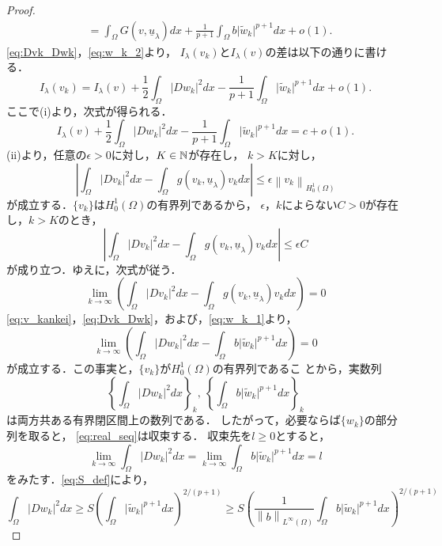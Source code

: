 \begin{proof}
\begin{align}
  &= \int_\Omega G(v, \underline{u}_\lambda) dx + \frac{1}{p+1}
  \int_\Omega b \lvert \tilde{w}_k \rvert^{p+1} dx + o(1). \label{eq:w_k_2}
 \end{align}
 \eqref{eq:Dvk_Dwk}，\eqref{eq:w_k_2}より，
 $I_\lambda(v_k)$と$I_\lambda(v)$の差は以下の通りに書ける．
 \[
  I_\lambda(v_k) = I_\lambda(v) + \frac{1}{2} \int_\Omega \lvert Dw_k
 \rvert^2 dx - \frac{1}{p+1} \int_\Omega \lvert \tilde{w}_k
 \rvert^{p+1} dx + o(1).
 \]
 ここで(i)より，次式が得られる．
 \begin{equation}
  I_\lambda(v) + \frac{1}{2} \int_\Omega \lvert Dw_k
   \rvert^2 dx - \frac{1}{p+1} \int_\Omega \lvert \tilde{w}_k
   \rvert^{p+1} dx = c + o(1). \label{eq:w_k_c}
 \end{equation}
 (ii)より，任意の$\epsilon > 0$に対し，$K \in \mathbb{N}$が存在し，
 $k > K$に対し，
 \[
 \left\lvert \int_\Omega \lvert Dv_k \rvert^2 dx - \int_\Omega g(v_k,
 \underline{u}_\lambda) v_k dx \right\rvert \leq \epsilon \left\| v_k
 \right\|_{H_0^1(\Omega)} 
 \]
 が成立する．$\{ v_k \}$は$H_0^1(\Omega)$の有界列であるから，
 $\epsilon$，$k$によらない$C > 0$が存在し，$k > K$のとき，
 \[
 \left\lvert \int_\Omega \lvert Dv_k \rvert^2 dx - \int_\Omega g(v_k,
 \underline{u}_\lambda) v_k dx \right\rvert \leq \epsilon C
 \]
 が成り立つ．ゆえに，次式が従う．
 \[
 \lim_{k \to \infty} \left( \int_\Omega \lvert Dv_k \rvert^2 dx -
 \int_\Omega g(v_k, \underline{u}_\lambda) v_k dx \right) = 0
 \]
 \eqref{eq:v_kankei}，\eqref{eq:Dvk_Dwk}，および，\eqref{eq:w_k_1}より，
 \[
 \lim_{k \to \infty} \left( \int_\Omega \lvert Dw_k \rvert^2 dx -
 \int_\Omega b \lvert \tilde{w}_k \rvert^{p+1} dx \right) = 0 
 \]
 が成立する．この事実と，$\{ v_k \}$が$H_0^1(\Omega)$の有界列であるこ
 とから，実数列
 \begin{equation}
  \left\{ \int_\Omega \lvert Dw_k \rvert^2 dx \right\}_k , \ 
  \left\{ \int_\Omega b \lvert \tilde{w}_k \rvert^{p+1} dx \right\}_k
  \label{eq:real_seq}
 \end{equation}
 は両方共ある有界閉区間上の数列である．
 したがって，必要ならば$\{ w_k \}$の部分列を取ると，
 \eqref{eq:real_seq}は収束する．
 収束先を$l \geq 0$とすると，
 \[
  \lim_{k \to \infty} \int_\Omega \lvert Dw_k \rvert^2 dx = \lim_{k
 \to \infty} \int_\Omega b \lvert \tilde{w}_k \rvert^{p+1} dx = l
 \]
 をみたす．\eqref{eq:S_def}により，
 \[
  \int_\Omega \lvert Dw_k \rvert^2 dx \geq S \left( \int_\Omega \lvert
 \tilde{w}_k \rvert^{p+1} dx \right)^{2/(p+1)} \geq S \left(
 \frac{1}{\left\| b \right\|_{L^\infty(\Omega)}} \int_\Omega b \lvert
 \tilde{w}_k \rvert^{p+1} dx \right)^{2/(p+1)}
\]
\end{proof}
